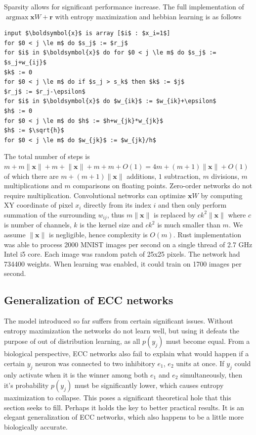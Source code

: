 \documentclass[12pt]{article}
\DeclareMathOperator*{\argmax}{argmax}
\begin{document}
Sparsity allows for significant performance increase. The full implementation of  $\argmax \boldsymbol{x} W+\boldsymbol{r}$ with entropy maximization and hebbian learning is as follows
\begin{lstlisting}
input $\boldsymbol{x}$ is array [$i$ : $x_i=1$]
for $0 < j \le m$ do $s_j$ := $r_j$ 
for $i$ in $\boldsymbol{x}$ do for $0 < j \le m$ do $s_j$ := $s_j+w_{ij}$
$k$ := 0
for $0 < j \le m$ do if $s_j > s_k$ then $k$ := $j$
$r_j$ := $r_j-\epsilon$
for $i$ in $\boldsymbol{x}$ do $w_{ik}$ := $w_{ik}+\epsilon$
$h$ := 0
for $0 < j \le m$ do $h$ := $h+w_{jk}*w_{jk}$
$h$ := $\sqrt{h}$
for $0 < j \le m$ do $w_{jk}$ := $w_{jk}/h$
\end{lstlisting}
The total number of steps is $m+m\lVert \boldsymbol{x}\rVert+m+\lVert \boldsymbol{x}\rVert+m+m + O(1)=4m+(m+1)\lVert \boldsymbol{x}\rVert + O(1)$ of which there are $m+(m+1)\lVert \boldsymbol{x}\rVert$ additions, $1$ subtraction, $m$ divisions, $m$ multiplications and $m$ comparisons on floating points. Zero-order networks do not require multiplication. Convolutional networks can optimize $\boldsymbol{x} W$ by computing XY coordinate of pixel $x_i$ directly from its index $i$ and then only perform summation of the surrounding $w_{ij}$, thus $m\lVert \boldsymbol{x}\rVert$ is replaced by $ck^2\lVert \boldsymbol{x}\rVert$ where $c$ is number of channels, $k$ is the kernel size and $ck^2$ is much smaller than $m$. We assume $\lVert \boldsymbol{x}\rVert$ is negligible, hence complexity is $O(m)$. Rust implementation  was able to process 2000 MNIST images per second on a single thread of 2.7 GHz Intel i5 core. Each image was random patch of 25x25 pixels. The network had 734400 weights. When learning was enabled, it could train on 1700 images per second. 

\subsection{Generalization of ECC networks} 
The model introduced so far suffers from certain significant issues. Without entropy maximization the networks do not learn well, but using it defeats the purpose of out of distribution learning, as all $p(y_j)$ must become equal. From a biological perspective, ECC networks also fail to explain what would happen if a certain $y_j$ neuron was connected to two inhibitory $e_1$, $e_2$ units at once. If $y_j$  could only activate when it is the winner among both $e_1$ and $e_2$ simultaneously, then it's probability $p(y_j)$ must be significantly lower, which causes entropy maximization to collapse. This poses a significant theoretical hole  that this section seeks to fill. Perhaps it holds the key to better practical results. It is an elegant generalization of ECC networks, which also happens to be a little more biologically accurate.
\end{document}
